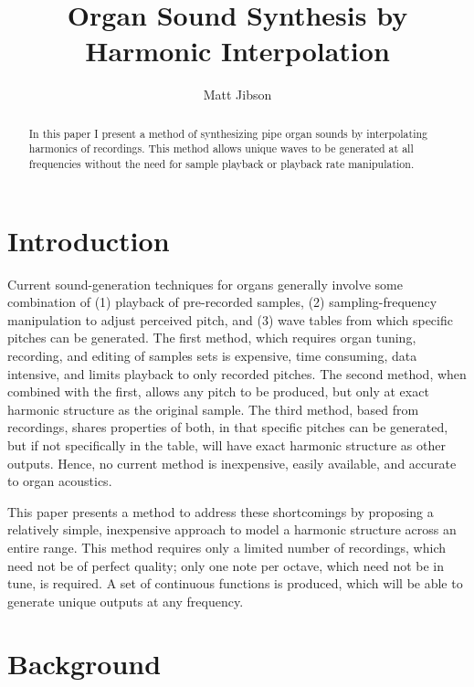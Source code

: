 \documentclass[twocolumn]{article}
\begin{document}
\title{Organ Sound Synthesis by Harmonic Interpolation}
\author{Matt Jibson}

\maketitle{}

\begin{abstract}

In this paper I present a method of synthesizing pipe organ sounds by interpolating harmonics of recordings. This method allows unique waves to be generated at all frequencies without the need for sample playback or playback rate manipulation.

\end{abstract}

\section{Introduction}

Current sound-generation techniques for organs generally involve some combination of (1) playback of pre-recorded samples, (2) sampling-frequency manipulation to adjust perceived pitch, and (3) wave tables from which specific pitches can be generated. The first method, which requires organ tuning, recording, and editing of samples sets is expensive, time consuming, data intensive, and limits playback to only recorded pitches. The second method, when combined with the first, allows any pitch to be produced, but only at exact harmonic structure as the original sample. The third method, based from recordings, shares properties of both, in that specific pitches can be generated, but if not specifically in the table, will have exact harmonic structure as other outputs. Hence, no current method is inexpensive, easily available, and accurate to organ acoustics.

This paper presents a method to address these shortcomings by proposing a relatively simple, inexpensive approach to model a harmonic structure across an entire range. This method requires only a limited number of recordings, which need not be of perfect quality; only one note per octave, which need not be in tune, is required. A set of continuous functions is produced, which will be able to generate unique outputs at any frequency.

\section{Background}
\end{document}
